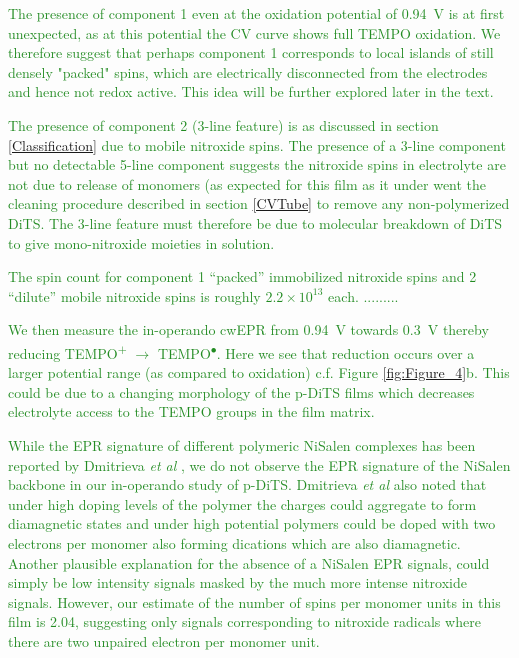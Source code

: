 \documentclass{WileyMSP-template}
\newcommand{\np}[1]{\textcolor{ForestGreen}{#1}}
\begin{document}
\bigbreak

\np{The presence of component 1 even at the oxidation potential of 0.94~V is at first unexpected, as at this potential the CV curve shows full TEMPO oxidation. We therefore suggest that perhaps  component 1 corresponds to local islands of still densely "packed" spins, which are electrically disconnected from the electrodes and hence not redox active. This idea will be further explored later in the text.}

\bigbreak

\np{The presence of component 2 (3-line feature) is as discussed in section \ref{Classification} due to mobile nitroxide spins. The presence of a 3-line component but no detectable 5-line component suggests the nitroxide spins in electrolyte are not due to release of monomers (as expected for this film as it under went the cleaning procedure described in section \ref{CVTube} to remove any non-polymerized DiTS. The 3-line feature must therefore be due to molecular breakdown of DiTS to give mono-nitroxide moieties in solution.}

\np{The spin count for component 1 ``packed'' immobilized nitroxide spins and 2 ``dilute'' mobile nitroxide spins is roughly $2.2\times10^{13}$ each. .........}

\bigbreak

\np{We then measure the in-operando cwEPR from 0.94~V towards 0.3~V thereby reducing TEMPO\textsuperscript{$+$} $\rightarrow$ TEMPO\textsuperscript{$\bullet$}. Here we see that reduction occurs over a larger potential range (as compared to oxidation) c.f. Figure \ref{fig:Figure_4}b. This could be due to a changing morphology of the p-DiTS films which decreases electrolyte access to the TEMPO groups in the film matrix.}

\np{While the EPR signature of different polymeric NiSalen complexes has been reported by Dmitrieva \textit{et al} \cite{Dmitrieva2018}, we do not observe the EPR signature of the NiSalen backbone in our in-operando study of p-DiTS. Dmitrieva \textit{et al} also noted that under high doping levels of the polymer the charges could aggregate to form diamagnetic states and under high potential polymers could be doped with two electrons per monomer also forming dications which are also diamagnetic. Another plausible explanation for the absence of a NiSalen EPR signals, could simply be low intensity signals masked by the much more intense nitroxide signals. However, our estimate of the number of spins per monomer units in this film is 2.04, suggesting only signals corresponding to nitroxide radicals where there are two unpaired electron per monomer unit.}
\end{document}

